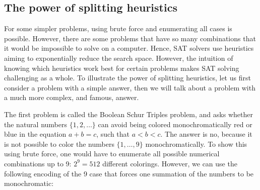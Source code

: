 \documentclass[12pt]{article}
\theoremstyle{definition}
\begin{document}
\subsection{The power of splitting heuristics} \label{subsec:splitheur}
For some simpler problems, using brute force and enumerating all cases is possible. However, there are some problems that have so many combinations that it would be impossible to solve on a computer. Hence, SAT solvers use heuristics aiming to exponentially reduce the search space. However, the intuition of knowing which heuristics work best for certain problems makes SAT solving challenging as a whole. To illustrate the power of splitting heuristics, let us first consider a problem with a simple answer, then we will talk about a problem with a much more complex, and famous, answer.\par
The first problem is called the Boolean Schur Triples problem, and asks whether the natural numbers $\{1, 2, \ldots \}$ can avoid being colored monochromatically red or blue in the equation $a + b = c$, such that $a < b < c$. The answer is no, because it is not possible to color the numbers $\{1, \ldots, 9\}$ monochromatically. To show this using brute force, one would have to enumerate all possible numerical combinations up to 9: $2^9 = 512$ different colorings. However, we can use the following encoding of the 9 case that forces one summation of the numbers to be monochromatic:
\end{document}

